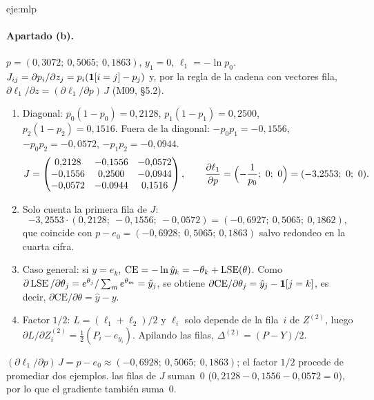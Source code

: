 \begin{solucion}{eje:mlp}
\paragraph{Apartado (b).}
\datos $p=(0{,}3072;\allowbreak\ 0{,}5065;\allowbreak\ 0{,}1863)$, $y_1=0$, $\ell_1=-\ln p_0$.
\planteamiento $J_{ij}=\partial p_i/\partial z_j=p_i(\mathbf{1}[i=j]-p_j)$ y, por la regla de la cadena con vectores fila, $\partial\ell_1/\partial z=(\partial\ell_1/\partial p)\,J$ (M09, §5.2).
\pasos
\begin{enumerate}[label=\arabic*.]
  \item Diagonal: $p_0(1-p_0)=0{,}2128$, $p_1(1-p_1)=0{,}2500$, $p_2(1-p_2)=0{,}1516$. Fuera de la diagonal: $-p_0p_1=-0{,}1556$, $-p_0p_2=-0{,}0572$, $-p_1p_2=-0{,}0944$.
  \[
  J=\begin{pmatrix}0{,}2128&-0{,}1556&-0{,}0572\\-0{,}1556&0{,}2500&-0{,}0944\\-0{,}0572&-0{,}0944&0{,}1516\end{pmatrix},\qquad
  \frac{\partial\ell_1}{\partial p}=\Bigl(-\frac{1}{p_0};\allowbreak\ 0;\allowbreak\ 0\Bigr)=(-3{,}2553;\allowbreak\ 0;\allowbreak\ 0).
  \]
  \item Solo cuenta la primera fila de $J$:
  \[
  -3{,}2553\cdot(0{,}2128;\allowbreak\ -0{,}1556;\allowbreak\ -0{,}0572)=(-0{,}6927;\allowbreak\ 0{,}5065;\allowbreak\ 0{,}1862),
  \]
  que coincide con $p-e_0=(-0{,}6928;\allowbreak\ 0{,}5065;\allowbreak\ 0{,}1863)$ salvo redondeo en la cuarta cifra.
  \item Caso general: si $y=e_k$, $\mathrm{CE}=-\ln\hat y_k=-\theta_k+\operatorname{LSE}(\theta)$. Como $\partial\operatorname{LSE}/\partial\theta_j=e^{\theta_j}/\sum_m e^{\theta_m}=\hat y_j$, se obtiene $\partial\mathrm{CE}/\partial\theta_j=\hat y_j-\mathbf{1}[j=k]$, es decir, $\partial\mathrm{CE}/\partial\theta=\hat y-y$.
  \item Factor $1/2$: $L=(\ell_1+\ell_2)/2$ y $\ell_i$ solo depende de la fila~$i$ de $Z^{(2)}$, luego $\partial L/\partial Z^{(2)}_i=\tfrac12(P_i-e_{y_i})$. Apilando las filas, $\Delta^{(2)}=(P-Y)/2$.
\end{enumerate}
\resultado $(\partial\ell_1/\partial p)\,J=p-e_0\approx(-0{,}6928;\allowbreak\ 0{,}5065;\allowbreak\ 0{,}1863)$; el factor $1/2$ procede de promediar dos ejemplos.
\comprobacion las filas de $J$ suman~0 ($0{,}2128-0{,}1556-0{,}0572=0$), por lo que el gradiente también suma~0.


\end{solucion}
